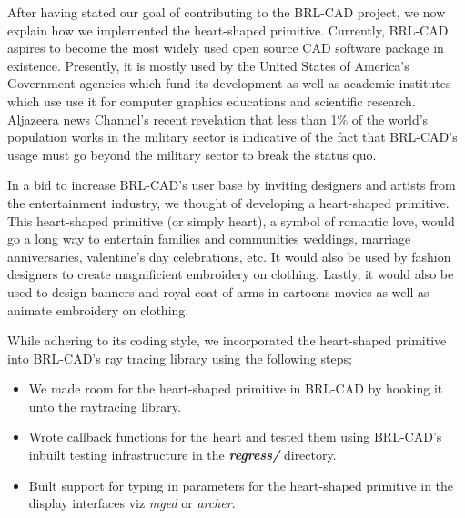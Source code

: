 \hspace{30} After   having   stated   our   goal   of   contributing   to   the   BRL-­CAD   project,   we  
now   explain   how   we   implemented   the   heart­-shaped   primitive.   Currently,  
BRL­-CAD   aspires   to   become   the   most   widely   used   open   source  
CAD   software   package   in   existence.   Presently,   it   is   mostly  
used   by   the   United   States   of   America's   Government   agencies   which   fund   its  
development   as   well   as   academic   institutes   which   use   use   it   for   computer  
graphics   educations   and   scientific   research.   Aljazeera   news   Channel's   recent  
revelation   that   less   than   1\%   of   the   world's   population   works   in   the   military   sector  
is   indicative   of   the   fact   that   BRL-­CAD's   usage   must   go   beyond   the   military  
sector to break the status­ quo.   

\hspace{30} In   a   bid   to   increase   BRL-­CAD's   user   base   by   inviting   designers   and  
artists   from   the   entertainment   industry,   we   thought   of   developing   a  
heart-­shaped   primitive.   This   heart­-shaped   primitive   (or   simply   heart),   a   symbol  
of   romantic   love,   would   go   a   long   way   to   entertain   families   and   communities  
weddings,   marriage   anniversaries,   valentine's   day   celebrations,   etc.   It   would  
also   be   used   by   fashion   designers   to   create   magnificient   embroidery   on  
clothing.   Lastly,   it   would   also   be   used   to   design   banners   and   royal   coat   of   arms  
in cartoons movies as well as animate embroidery on clothing.   

\hspace{30} While   adhering   to   its   coding   style,   we   incorporated   the   heart-­shaped  
primitive into BRL­-CAD's ray tracing library using the following steps;  

\begin{itemize}
\item We made room for the heart-shaped primitive in BRL­-CAD by hooking it unto the raytracing library.  
\item Wrote callback   functions   for   the   heart   and   tested   them   using   BRL-­CAD's  
inbuilt testing infrastructure in the \textit{\textbf{regress/}} directory.  
\item Built   support   for   typing   in   parameters   for   the   heart­-shaped   primitive   in   the  
display interfaces viz \textit{mged} or \textit{archer}.
\end{itemize}

